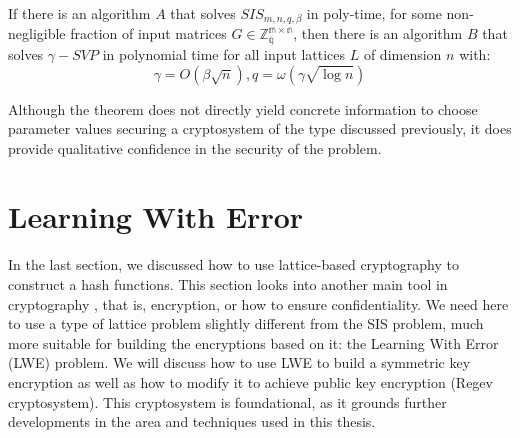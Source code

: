 \begin{theorem}
   If there is an algorithm $A$ that solves
  $SIS_{m,n,q,\beta}$ in poly-time, for some non-negligible fraction of input
  matrices $G \in \mathbb{Z_q^{m \times n}}$, then there is an algorithm $B$
  that solves $\gamma-SVP$ in polynomial time for all input lattices $L$ of
  dimension $n$ with:
  \[
    \gamma = O(\beta\sqrt{n}), q = \omega(\gamma\sqrt{\log n})
  \]
  \label{theo:AjtaiHardness}
\end{theorem}

Although the theorem does not directly yield concrete information to choose
parameter values securing a cryptosystem of the type discussed previously, it does provide qualitative confidence in the security of the problem.

\section{Learning With Error}
\label{sub:LWE}
In the last section, we discussed how to use lattice-based cryptography to
construct a hash functions. This section looks into another main tool in
cryptography , that is, encryption, or how to ensure confidentiality. We need here to
use a type of lattice problem slightly different from the SIS problem, much more suitable for building the encryptions based on it: the Learning With Error (LWE) problem. We will discuss how to use LWE to build a symmetric key encryption as well as how to modify it to achieve public key encryption (Regev cryptosystem). This cryptosystem is foundational, as it grounds further developments in the area and techniques used in this thesis.

